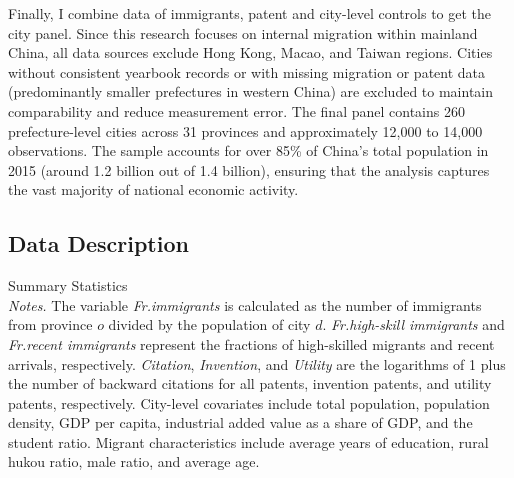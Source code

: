 \documentclass[12pt]{article}
\begin{document}
Finally, I combine data of immigrants, patent and city-level controls to get the city panel.
Since this research focuses on internal migration within mainland China, all data sources exclude Hong Kong, Macao, and Taiwan regions.  Cities without consistent yearbook records or with missing migration or patent data (predominantly smaller prefectures in western China) are excluded to maintain comparability and reduce measurement error. The final panel contains 260 prefecture-level cities across 31 provinces and approximately 12,000 to 14,000 observations. The sample accounts for over 85\% of China's total population in 2015 (around 1.2 billion out of 1.4 billion), ensuring that the analysis captures the vast majority of national economic activity. 

\subsection{Data Description} \label{sec:description}

\begin{table}[!htbp]
 \centering 
 \resizebox{\textwidth}{!}{
   
   }
 \caption{Summary Statistics \vspace{1ex} \\ 
   {\footnotesize \emph{Notes.} The variable \emph{Fr.immigrants} is calculated as the number of immigrants from province $o$ divided by the population of city $d$. \emph{Fr.high-skill immigrants} and \emph{Fr.recent immigrants} represent the fractions of high-skilled migrants and recent arrivals, respectively. \emph{Citation}, \emph{Invention}, and \emph{Utility} are the logarithms of 1 plus the number of backward citations for all patents, invention patents, and utility patents, respectively. City-level covariates include total population, population density, GDP per capita, industrial added value as a share of GDP, and the student ratio. Migrant characteristics include average years of education, rural hukou ratio, male ratio, and average age. }}
 \label{tab:summary}
\end{table}
\end{document}

